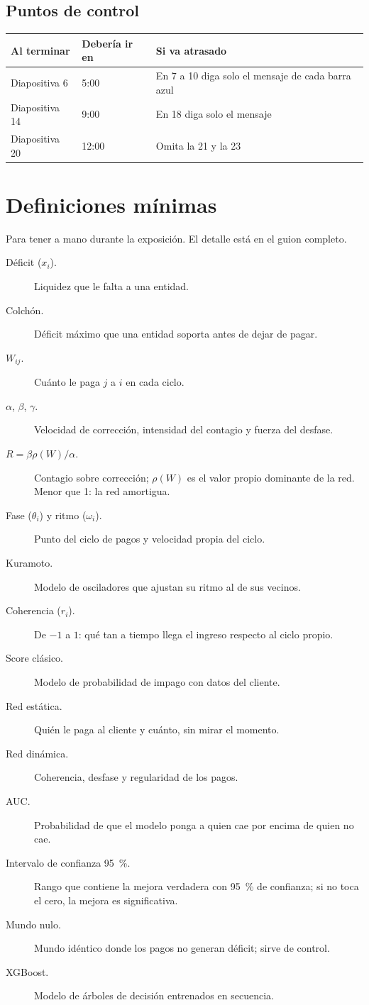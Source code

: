 \documentclass[11pt,a4paper,oneside]{article}
\begin{document}
\subsection{Puntos de control}
\begin{center}
\begin{tabular}{lll}
\toprule
Al terminar & Debería ir en & Si va atrasado \\
\midrule
Diapositiva 6 & 5:00 & En 7 a 10 diga solo el mensaje de cada barra azul \\
Diapositiva 14 & 9:00 & En 18 diga solo el mensaje \\
Diapositiva 20 & 12:00 & Omita la 21 y la 23 \\
\bottomrule
\end{tabular}
\end{center}



\section{Definiciones mínimas}

Para tener a mano durante la exposición. El detalle está en el guion completo.

\begin{description}
\item[Déficit ($x_i$).] Liquidez que le falta a una entidad.
\item[Colchón.] Déficit máximo que una entidad soporta antes de dejar de pagar.
\item[$W_{ij}$.] Cuánto le paga $j$ a $i$ en cada ciclo.
\item[$\alpha$, $\beta$, $\gamma$.] Velocidad de corrección, intensidad del contagio y
fuerza del desfase.
\item[$R=\beta\rho(W)/\alpha$.] Contagio sobre corrección; $\rho(W)$ es el valor propio
dominante de la red. Menor que 1: la red amortigua.
\item[Fase ($\theta_i$) y ritmo ($\omega_i$).] Punto del ciclo de pagos y velocidad
propia del ciclo.
\item[Kuramoto.] Modelo de osciladores que ajustan su ritmo al de sus vecinos.
\item[Coherencia ($r_i$).] De $-1$ a $1$: qué tan a tiempo llega el ingreso respecto al
ciclo propio.
\item[Score clásico.] Modelo de probabilidad de impago con datos del cliente.
\item[Red estática.] Quién le paga al cliente y cuánto, sin mirar el momento.
\item[Red dinámica.] Coherencia, desfase y regularidad de los pagos.
\item[AUC.] Probabilidad de que el modelo ponga a quien cae por encima de quien no cae.
\item[Intervalo de confianza 95~\%.] Rango que contiene la mejora verdadera con 95~\% de
confianza; si no toca el cero, la mejora es significativa.
\item[Mundo nulo.] Mundo idéntico donde los pagos no generan déficit; sirve de control.
\item[XGBoost.] Modelo de árboles de decisión entrenados en secuencia.
\end{description}
\end{document}
